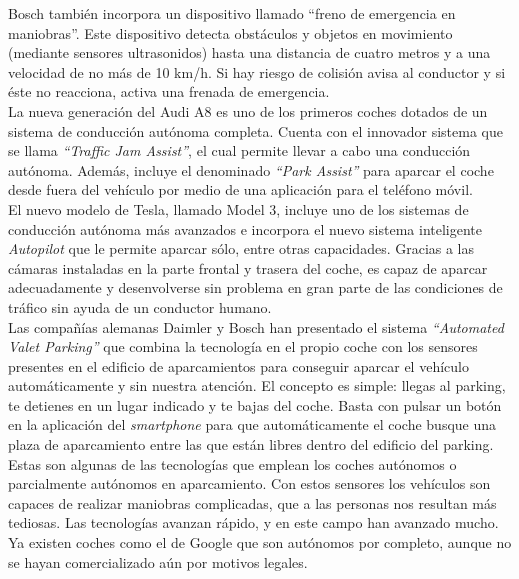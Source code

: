 Bosch también incorpora un dispositivo llamado ``freno de emergencia en maniobras''. Este dispositivo detecta obstáculos y objetos en movimiento (mediante sensores ultrasonidos) hasta una distancia de cuatro metros y a una velocidad de no más de 10 km/h. Si hay riesgo de colisión avisa al conductor y si éste no reacciona, activa una frenada de emergencia.\\

La nueva generación del Audi A8 es uno de los primeros coches dotados de un sistema de conducción autónoma completa. Cuenta con el innovador sistema que se llama \textit{``Traffic Jam Assist''}, el cual permite llevar a cabo una conducción autónoma. Además, incluye el denominado \textit{``Park Assist''} para aparcar el coche desde fuera del vehículo por medio de una aplicación para el teléfono móvil.\\

El nuevo modelo de Tesla, llamado Model 3, incluye uno de los sistemas de conducción autónoma más avanzados e incorpora el nuevo sistema inteligente \textit{Autopilot} que le permite aparcar sólo, entre otras capacidades. Gracias a las cámaras instaladas en la parte frontal y trasera del coche, es capaz de aparcar adecuadamente y desenvolverse sin problema en gran parte de las condiciones de tráfico sin ayuda de un conductor humano.\\

Las compañías alemanas Daimler y Bosch han presentado el sistema \textit{“Automated Valet Parking”} que combina la tecnología en el propio coche con los sensores presentes en el edificio de aparcamientos para conseguir aparcar el vehículo automáticamente y sin nuestra atención. El concepto es simple: llegas al parking, te detienes en un lugar indicado y te bajas del coche. Basta con pulsar un botón en la aplicación del \textit{smartphone} para que automáticamente el coche busque una plaza de aparcamiento entre las que están libres dentro del edificio del parking.\\

Estas son algunas de las tecnologías que emplean los coches autónomos o parcialmente autónomos en aparcamiento. Con estos sensores los vehículos son capaces de realizar maniobras complicadas, que a las personas nos resultan más tediosas. Las tecnologías avanzan rápido, y en este campo han avanzado mucho. Ya existen coches como el de Google que son autónomos por completo, aunque no se hayan comercializado aún por motivos legales. 

